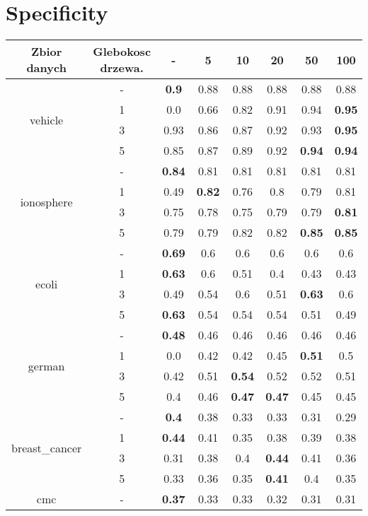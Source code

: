 \documentclass{article}%
\begin{document}
\section*{Specificity}%
\begin{longtable}{c|c|cccccc}%
\hline%
Zbior danych&Glebokosc drzewa.&{-}&5&10&20&50&100\\%
\hline%
\multirow{4}{*}{vehicle}&{-}&\textbf{0.9}&0.88&0.88&0.88&0.88&0.88\\%
\cline{2%
-%
8}%
&1&0.0&0.66&0.82&0.91&0.94&\textbf{0.95}\\%
\cline{2%
-%
8}%
&3&0.93&0.86&0.87&0.92&0.93&\textbf{0.95}\\%
\cline{2%
-%
8}%
&5&0.85&0.87&0.89&0.92&\textbf{0.94}&\textbf{0.94}\\%
\hline%
\multirow{4}{*}{ionosphere}&{-}&\textbf{0.84}&0.81&0.81&0.81&0.81&0.81\\%
\cline{2%
-%
8}%
&1&0.49&\textbf{0.82}&0.76&0.8&0.79&0.81\\%
\cline{2%
-%
8}%
&3&0.75&0.78&0.75&0.79&0.79&\textbf{0.81}\\%
\cline{2%
-%
8}%
&5&0.79&0.79&0.82&0.82&\textbf{0.85}&\textbf{0.85}\\%
\hline%
\multirow{4}{*}{ecoli}&{-}&\textbf{0.69}&0.6&0.6&0.6&0.6&0.6\\%
\cline{2%
-%
8}%
&1&\textbf{0.63}&0.6&0.51&0.4&0.43&0.43\\%
\cline{2%
-%
8}%
&3&0.49&0.54&0.6&0.51&\textbf{0.63}&0.6\\%
\cline{2%
-%
8}%
&5&\textbf{0.63}&0.54&0.54&0.54&0.51&0.49\\%
\hline%
\multirow{4}{*}{german}&{-}&\textbf{0.48}&0.46&0.46&0.46&0.46&0.46\\%
\cline{2%
-%
8}%
&1&0.0&0.42&0.42&0.45&\textbf{0.51}&0.5\\%
\cline{2%
-%
8}%
&3&0.42&0.51&\textbf{0.54}&0.52&0.52&0.51\\%
\cline{2%
-%
8}%
&5&0.4&0.46&\textbf{0.47}&\textbf{0.47}&0.45&0.45\\%
\hline%
\multirow{4}{*}{breast\_cancer}&{-}&\textbf{0.4}&0.38&0.33&0.33&0.31&0.29\\%
\cline{2%
-%
8}%
&1&\textbf{0.44}&0.41&0.35&0.38&0.39&0.38\\%
\cline{2%
-%
8}%
&3&0.31&0.38&0.4&\textbf{0.44}&0.41&0.36\\%
\cline{2%
-%
8}%
&5&0.33&0.36&0.35&\textbf{0.41}&0.4&0.35\\%
\hline%
\multirow{4}{*}{cmc}&{-}&\textbf{0.37}&0.33&0.33&0.32&0.31&0.31\\%

\end{longtable}
\end{document}
